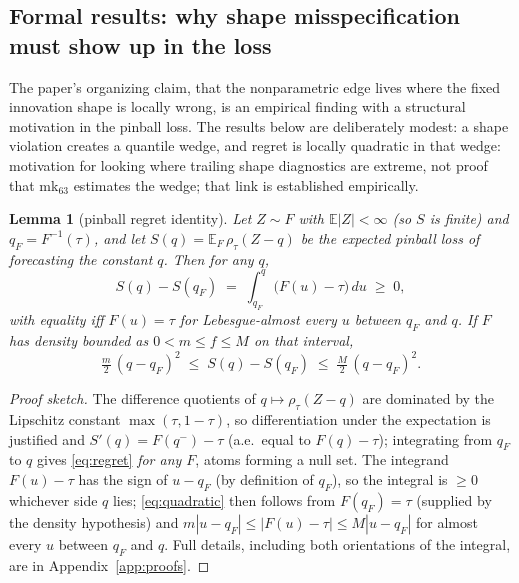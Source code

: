 \documentclass[11pt]{article}
\newtheorem{lemma}{Lemma}
\theoremstyle{remark}
\begin{document}
\subsection{Formal results: why shape misspecification must show up in
the loss}\label{sec:theory}

The paper's organizing claim, that the nonparametric edge lives where
the fixed innovation shape is locally wrong, is an empirical finding with a structural motivation in the pinball loss. The results
below are deliberately modest: a shape violation creates a quantile
wedge, and regret is locally quadratic in that wedge: motivation for looking where trailing shape diagnostics are extreme, not proof that
mk$_{63}$ estimates the wedge; that link is established empirically.

\begin{lemma}[pinball regret identity]\label{lem:regret}
Let $Z \sim F$ with $\mathbb{E}|Z| < \infty$ (so $S$ is finite) and
$q_F = F^{-1}(\tau)$, and let
$S(q) = \mathbb{E}_F\,\rho_\tau(Z - q)$ be the expected pinball loss of
forecasting the constant $q$. Then for any $q$,
\begin{equation}
S(q) - S(q_F) \;=\; \int_{q_F}^{q} \big(F(u) - \tau\big)\,du \;\ge\; 0,
\label{eq:regret}
\end{equation}
with equality iff $F(u) = \tau$ for Lebesgue-almost every $u$ between $q_F$ and $q$.
If $F$ has density bounded as $0 < m \le f \le M$ on that interval,
\begin{equation}
\tfrac{m}{2}\,(q - q_F)^2 \;\le\; S(q) - S(q_F) \;\le\;
\tfrac{M}{2}\,(q - q_F)^2 .
\label{eq:quadratic}
\end{equation}
\end{lemma}
\begin{proof}[Proof sketch]
The difference quotients of $q\mapsto\rho_\tau(Z-q)$ are dominated by
the Lipschitz constant $\max(\tau,1-\tau)$, so differentiation under the
expectation is justified and $S'(q)=F(q^-)-\tau$ (a.e.\ equal to
$F(q)-\tau$); integrating from $q_F$ to $q$ gives \eqref{eq:regret}
\emph{for any $F$}, atoms forming a null set. The integrand
$F(u)-\tau$ has the sign of $u-q_F$ (by definition of $q_F$), so the
integral is $\ge 0$ whichever side $q$ lies; \eqref{eq:quadratic} then
follows from $F(q_F)=\tau$ (supplied by the density hypothesis) and
$m|u-q_F|\le |F(u)-\tau|\le M|u-q_F|$ for almost every $u$ between
$q_F$ and $q$. Full details, including both
orientations of the integral, are in Appendix~\ref{app:proofs}.
\end{proof}
\end{document}
